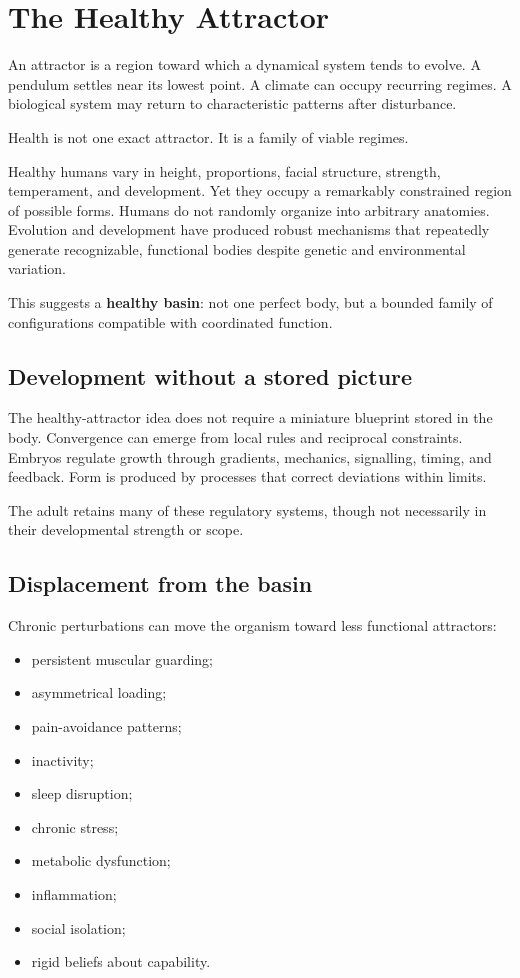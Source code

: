 \chapter{The Healthy Attractor}

An attractor is a region toward which a dynamical system tends to evolve. A pendulum settles near its lowest point. A climate can occupy recurring regimes. A biological system may return to characteristic patterns after disturbance.

Health is not one exact attractor. It is a family of viable regimes.

Healthy humans vary in height, proportions, facial structure, strength, temperament, and development. Yet they occupy a remarkably constrained region of possible forms. Humans do not randomly organize into arbitrary anatomies. Evolution and development have produced robust mechanisms that repeatedly generate recognizable, functional bodies despite genetic and environmental variation.

This suggests a \textbf{healthy basin}: not one perfect body, but a bounded family of configurations compatible with coordinated function.

\section{Development without a stored picture}

The healthy-attractor idea does not require a miniature blueprint stored in the body. Convergence can emerge from local rules and reciprocal constraints. Embryos regulate growth through gradients, mechanics, signalling, timing, and feedback. Form is produced by processes that correct deviations within limits.

The adult retains many of these regulatory systems, though not necessarily in their developmental strength or scope.

\section{Displacement from the basin}

Chronic perturbations can move the organism toward less functional attractors:

\begin{itemize}
\tightlist
\item
  persistent muscular guarding;
\item
  asymmetrical loading;
\item
  pain-avoidance patterns;
\item
  inactivity;
\item
  sleep disruption;
\item
  chronic stress;
\item
  metabolic dysfunction;
\item
  inflammation;
\item
  social isolation;
\item
  rigid beliefs about capability.
\end{itemize}

